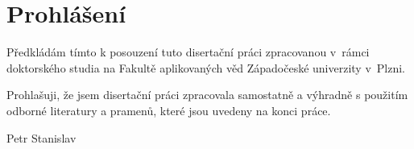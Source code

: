 \thispagestyle{empty}
\chapter*{Prohlášení}

\noindent Předkládám tímto k posouzení tuto disertační práci zpracovanou v~rámci doktorského studia na Fakultě aplikovaných věd Západočeské univerzity v~Plzni.

\vspace*{1cm}

\noindent Prohlašuji, že jsem disertační práci zpracovala samostatně a výhradně s použitím odborné literatury a pramenů, které jsou uvedeny na konci práce.

\vspace*{2cm}


 \hspace*{8cm} {Petr Stanislav}
